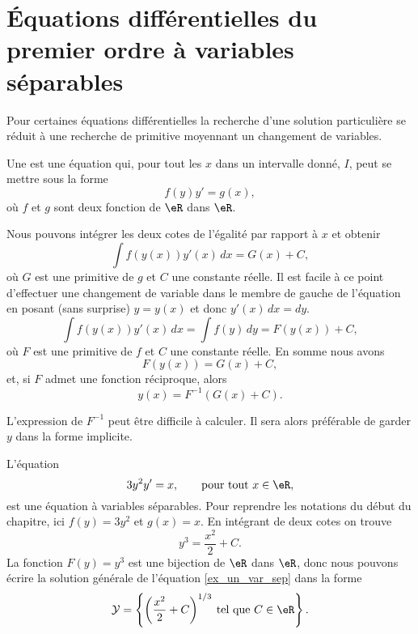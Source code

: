 \section{Équations différentielles du premier ordre à variables séparables}

Pour certaines équations différentielles la recherche d'une solution particulière se réduit à une recherche de primitive moyennant un changement de variables. 
\begin{definition}
Une   est une équation qui, pour tout les \(x\) dans un intervalle donné, \(I\), peut se mettre sous la forme
\begin{equation}\label{eq_var_sep}
  f(y)y' = g(x),
\end{equation}
o\`u \(f\) et \(g\) sont deux fonction de \(\eR\) dans \(\eR\).
\end{definition}
Nous pouvons intégrer les deux cotes de l'égalité par rapport à \(x\) et obtenir 
\[
  \int f(y(x))y'(x)\, dx = G(x)+C,
\]
o\`u $G$ est une primitive de $g$ et $C$ une constante réelle. Il est facile \`a ce point d'effectuer une changement de variable dans le membre de gauche de l'équation en posant (sans surprise) \(y= y(x)\) et donc \(y'(x)\,dx = dy\). 
\[
  \int f(y(x))y'(x)\, dx =  \int f(y)\, dy  = F(y(x)) + C ,
\]
o\`u $F$ est une primitive de $f$ et $C$ une constante réelle. En somme nous avons
\[
  F(y(x)) = G(x) + C ,
\]
et, si $F$ admet une fonction réciproque, alors 
\begin{equation}
  y(x) = F^{-1} (G(x)+C).
\end{equation}
\begin{remark}
  L'expression de $F^{-1} $ peut être difficile à calculer. Il sera alors préférable de garder $y$ dans la forme implicite. 
\end{remark}

\begin{example}
  L'équation
  \begin{equation}\label{ex_un_var_sep}
    3y^2 y' = x, \qquad\text{pour tout } x\in\eR,
  \end{equation}
est une équation à variables séparables. Pour reprendre les notations du début du chapitre, ici \(f(y) = 3y^2\) et \(g(x) = x\). En intégrant de deux cotes on trouve 
\[
y^3 = \frac{x^2}{2} + C .
\]
La fonction $F(y) = y^3$ est une bijection de $\eR$ dans $\eR$, donc nous pouvons écrire la solution générale de l'équation \eqref{ex_un_var_sep} dans la forme 
\[
\mathcal{Y} =\left\{ \left(\frac{x^2}{2} + C \right)^{1/3} \:\text{tel que } C\in\eR\right\}. 
\]
\end{example}

